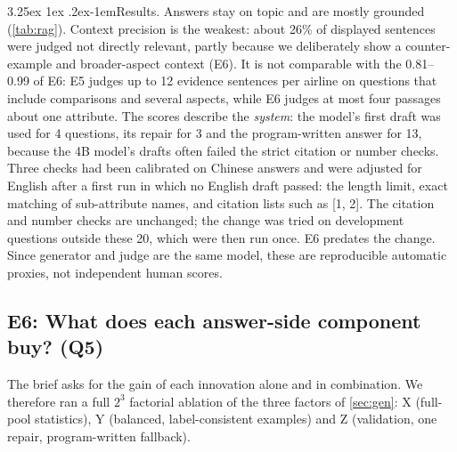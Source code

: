 \documentclass[10pt,twocolumn,a4paper]{article}
\makeatletter
\renewcommand\paragraph{\@startsection{paragraph}{4}{\parindent}%
  {3.25ex \@plus 1ex \@minus .2ex}{-1em}{\normalfont\normalsize\bfseries}}
\makeatother
\begin{document}
\paragraph{Results.} Answers stay on topic and are mostly grounded (\cref{tab:rag}). Context precision is the weakest:
about 26\% of displayed sentences were judged not directly relevant, partly because we deliberately show a
counter-example and broader-aspect context (E6). It is not comparable with the 0.81--0.99 of E6: E5 judges up to
12 evidence sentences per airline on questions that include comparisons and several aspects, while E6 judges
at most four passages about one attribute. The scores describe the \emph{system}: the model's first draft was used
for 4 questions, its repair for 3 and the program-written answer for 13, because the 4B model's drafts often failed the
strict citation or number checks. Three checks had been calibrated on Chinese answers and were adjusted for English after a
first run in which no English draft passed: the length limit, exact matching of sub-attribute names, and citation lists
such as [1, 2]. The citation and number checks are unchanged; the change was tried on development questions outside these
20, which were then run once. E6 predates the change. Since generator and judge are the same model, these are reproducible automatic
proxies, not independent human scores.

\subsection{E6: What does each answer-side component buy? (Q5)}
\label{sec:exp-abl}

The brief asks for the gain of each innovation alone and in combination. We therefore ran a full $2^3$ factorial
ablation of the three factors of \cref{sec:gen}: X (full-pool statistics), Y (balanced, label-consistent examples) and
Z (validation, one repair, program-written fallback).
\end{document}

